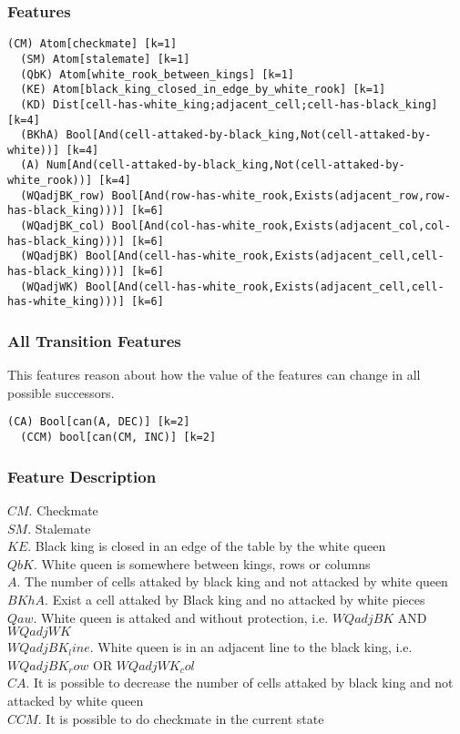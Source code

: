 \documentclass[a4paper]{article}
\begin{document}
\subsubsection{Features}
\begin{Verbatim}[fontsize=\footnotesize]
  (CM) Atom[checkmate] [k=1]
  (SM) Atom[stalemate] [k=1]
  (QbK) Atom[white_rook_between_kings] [k=1]
  (KE) Atom[black_king_closed_in_edge_by_white_rook] [k=1]
  (KD) Dist[cell-has-white_king;adjacent_cell;cell-has-black_king] [k=4]
  (BKhA) Bool[And(cell-attaked-by-black_king,Not(cell-attaked-by-white))] [k=4]
  (A) Num[And(cell-attaked-by-black_king,Not(cell-attaked-by-white_rook))] [k=4]
  (WQadjBK_row) Bool[And(row-has-white_rook,Exists(adjacent_row,row-has-black_king)))] [k=6]
  (WQadjBK_col) Bool[And(col-has-white_rook,Exists(adjacent_col,col-has-black_king)))] [k=6]
  (WQadjBK) Bool[And(cell-has-white_rook,Exists(adjacent_cell,cell-has-black_king)))] [k=6]
  (WQadjWK) Bool[And(cell-has-white_rook,Exists(adjacent_cell,cell-has-white_king)))] [k=6]
\end{Verbatim}


\subsubsection{All Transition Features}
This features reason about how the value of the features can change in all possible successors.
\begin{Verbatim}[fontsize=\footnotesize]
  (CA) Bool[can(A, DEC)] [k=2]
  (CCM) bool[can(CM, INC)] [k=2]
\end{Verbatim}


\subsubsection{Feature Description}
$CM$. Checkmate\\
$SM$. Stalemate\\
$KE$. Black king is closed in an edge of the table by the white queen\\
$QbK$. White queen is somewhere between kings, rows or columns\\
$A$. The number of cells attaked by black king and not attacked by white queen\\
$BKhA$. Exist a cell attaked by Black king and no attacked by white pieces\\
$Qaw$. White queen is attaked and without protection, i.e. $WQadjBK$ AND $WQadjWK$\\
$WQadjBK_line$. White queen is in an adjacent line to the black king, i.e. $WQadjBK_row$ OR $WQadjWK_col$\\
$CA$. It is possible to decrease the number of cells attaked by black king and not attacked by white queen\\
$CCM$. It is possible to do checkmate in the current state
\end{document}

